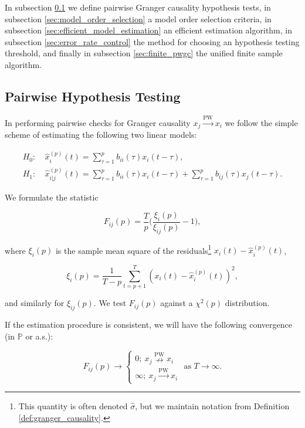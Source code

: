 \documentclass{statsoc}
\def\pwgc{\overset{\text{PW}}{\rightarrow}}  %
\def\npwgc{\overset{\text{PW}}{\nrightarrow}}  %
\def\P{\mathbb{P}}  %
\begin{document}
In subsection \ref{sec:pairwise_hypothesis_testing} we define pairwise
Granger causality hypothesis tests, in subsection
\ref{sec:model_order_selection} a model order selection criteria, in
subsection \ref{sec:efficient_model_estimation} an efficient
estimation algorithm, in subsection \ref{sec:error_rate_control} the
method for choosing an hypothesis testing threshold, and finally in
subsection \ref{sec:finite_pwgc} the unified finite sample algorithm.

\subsection{Pairwise Hypothesis Testing}
\label{sec:pairwise_hypothesis_testing}
In performing pairwise checks for Granger causality $x_j \pwgc x_i$ we
follow the simple scheme of estimating the following two linear models:

\begin{align}
  H_0:&\ \widehat{x}_i^{(p)}(t) = \sum_{\tau = 1}^{p} b_{ii}(\tau)x_i(t - \tau),\\
  H_1:&\ \widehat{x}_{i|j}^{(p)}(t) = \sum_{\tau = 1}^{p} b_{ii}(\tau)x_i(t - \tau) + \sum_{\tau = 1}^pb_{ij}(\tau)x_j(t - \tau).
\end{align}

We formulate the statistic 

\begin{equation}
  \label{eqn:gc_statistics}
  F_{ij}(p) = \frac{T}{p}\Big(\frac{\xi_i(p)}{\xi_{ij}(p)} - 1\Big),
\end{equation}

where $\xi_i(p)$ is the sample mean square of the
residuals\footnote{This quantity is often denoted $\widehat{\sigma}$,
  but we maintain notation from Definition
  \ref{def:granger_causality}.}  $x_i(t) - \widehat{x}^{(p)}_i(t)$,

\begin{equation*}
  \xi_i(p) = \frac{1}{T - p}\sum_{t = p + 1}^T (x_i(t) - \widehat{x}_i^{(p)}(t))^2,
\end{equation*}

and similarly for $\xi_{ij}(p)$.  We test $F_{ij}(p)$ against a
$\chi^2(p)$ distribution.

If the estimation procedure is consistent, we will have the following
convergence (in $\P$ or a.s.):

\begin{equation}
  F_{ij}(p) \rightarrow
  \left\{
    \begin{array}{ll}
      0;\ x_j \npwgc x_i\\
      \infty;\ x_j \pwgc x_i
    \end{array}
  \right. \text{ as } T \rightarrow \infty.  %
\end{equation}
\end{document}
